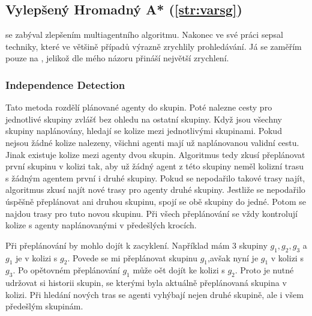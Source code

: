 \subsection{Vylepšený Hromadný A* (\ref{str:varsg})}\label{subsec:vylepseny_hromadny_a_star}

\citeauthor{Standley_2010} se zabýval zlepšením multiagentního  algoritmu.
Nakonec ve své práci \citet*{Standley_2010} sepsal techniky, které ve většině případů výrazně zrychlily prohledávání.
Já se zaměřím pouze na ,
jelikož dle mého názoru přináší největší zrychlení.

\subsubsection{Independence Detection}\label{subsubsec:varsg_independence_detection}

Tato metoda rozdělí plánované agenty do skupin.
Poté nalezne cesty pro jednotlivé skupiny zvlášť bez ohledu na ostatní skupiny.
Když jsou všechny skupiny naplánovány, hledají se kolize mezi jednotlivými skupinami.
Pokud nejsou žádné kolize nalezeny, všichni agenti mají už naplánovanou validní cestu.
Jinak existuje kolize mezi agenty dvou skupin.
Algoritmus tedy zkusí přeplánovat první skupinu v kolizi tak,
aby už žádný agent z této skupiny neměl kolizní trasu s žádným agentem první i druhé skupiny.
Pokud se nepodařilo takové trasy najít, algoritmus zkusí najít nové trasy pro agenty druhé skupiny.
Jestliže se nepodařilo úspěšně přeplánovat ani druhou skupinu, spojí se obě skupiny do jedné.
Potom se najdou trasy pro tuto novou skupinu.
Při všech přeplánování se vždy kontrolují kolize s agenty naplánovanými v předešlých krocích.

Při přeplánování by mohlo dojít k zacyklení.
Například mám $3$ skupiny $g_1, g_2, g_3$ a $g_1$ je v kolizi s $g_2$.
Povede se mi přeplánovat skupinu $g_1$,avšak nyní je $g_1$ v kolizi s $g_3$.
Po opětovném přeplánování $g_1$ může oět dojít ke kolizi s $g_2$.
Proto je nutné udržovat si historii skupin, se kterými byla aktuálně přeplánovaná skupina v kolizi.
Při hledání nových tras se agenti vyhýbají nejen druhé skupině, ale i všem předešlým skupinám.

